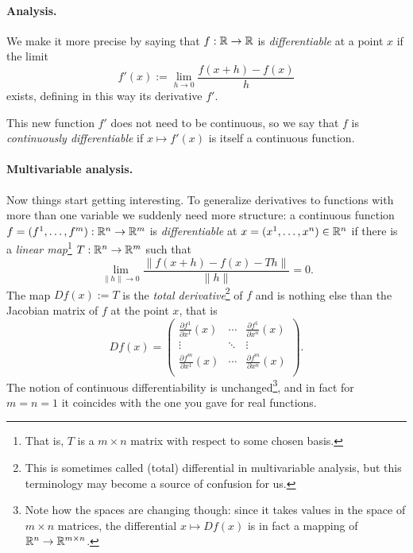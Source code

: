 \paragraph{Analysis.} We make it more precise by saying that $f:\mathbb{R}\to\mathbb{R}$ is \emph{differentiable} at a point $x$ if the limit
\begin{equation}
	f'(x) := \lim_{h\to0} \frac{f(x+h) - f(x)}{h}
\end{equation}
exists, defining in this way its derivative $f'$.

This new function $f'$ does not need to be continuous, so we say that $f$ is \emph{continuously differentiable} if $x\mapsto f'(x)$ is itself a continuous function.

\paragraph{Multivariable analysis.} Now things start getting interesting. To generalize derivatives to functions with more than one variable we suddenly need more structure: a continuous function $f=(f^1, \ldots, f^m):\mathbb{R}^n\to\mathbb{R}^m$ is \emph{differentiable} at $x=(x^1,\ldots,x^n)\in\mathbb{R}^n$ if there is a \emph{linear map}\footnote{That is, $T$ is a $m\times n$ matrix with respect to some chosen basis.} $T: \mathbb{R}^n\to\mathbb{R}^m$ such that
\begin{equation}\label{eq:diff}
	\lim_{\|h\|\to 0} \frac{\|f(x+h) - f(x) - T h\|}{\|h\|} = 0.
\end{equation}
The map $Df(x) := T$ is the \emph{total derivative}\footnote{This is sometimes called (total) differential in multivariable analysis, but this terminology may become a source of confusion for us.} of $f$ and is nothing else than the Jacobian matrix of $f$ at the point $x$, that is
\begin{equation}\label{eq:jacobian}
	Df(x) = \begin{pmatrix}
		\frac{\partial f^1}{\partial x^1}(x) & \cdots & \frac{\partial f^1}{\partial x^n}(x) \\
		\vdots                               & \ddots & \vdots                               \\
		\frac{\partial f^m}{\partial x^1}(x) & \cdots & \frac{\partial f^m}{\partial x^n}(x) \\
	\end{pmatrix}.
\end{equation}
The notion of continuous differentiability is unchanged\footnote{Note how the spaces are changing though: since it takes values in the space of $m\times n$ matrices, the differential $x\mapsto Df(x)$ is in fact a mapping of $\mathbb{R}^n \to \mathbb{R}^{m\times n}$.}, and in fact for $m=n=1$ it coincides with the one you gave for real functions.
\medskip

